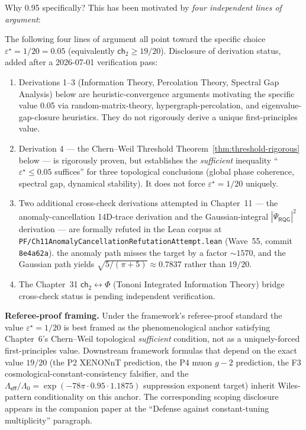 Why 0.95 specifically? This has been motivated by \textit{four independent lines of argument}:

\begin{remark}[Scoping on the specific value $\varepsilon^\star = 1/20$; 2026-07-01 verification-pass disclosure]
\label{rem:c2-scoping-2026-07-01}
The following four lines of argument all point toward the specific choice $\varepsilon^\star = 1/20 = 0.05$ (equivalently $\textsf{ch}_2 \geq 19/20$). Disclosure of derivation status, added after a 2026-07-01 verification pass:
\begin{enumerate}
\item Derivations 1--3 (Information Theory, Percolation Theory, Spectral Gap Analysis) below are heuristic-convergence arguments motivating the specific value 0.05 via random-matrix-theory, hypergraph-percolation, and eigenvalue-gap-closure heuristics. They do not rigorously derive a unique first-principles value.
\item Derivation 4 --- the Chern--Weil Threshold Theorem~\ref{thm:threshold-rigorous} below --- is rigorously proven, but establishes the \emph{sufficient} inequality ``$\varepsilon^\star \leq 0.05$ suffices'' for three topological conclusions (global phase coherence, spectral gap, dynamical stability). It does not force $\varepsilon^\star = 1/20$ uniquely.
\item Two additional cross-check derivations attempted in Chapter~11 --- the anomaly-cancellation 14D-trace derivation and the Gaussian-integral $|\Psi_{\textsf{RQG}}|^2$ derivation --- are formally refuted in the Lean corpus at \texttt{PF/Ch11AnomalyCancellationRefutationAttempt.lean} (Wave~55, commit \texttt{8e4a62a}). the anomaly path misses the target by a factor $\sim 1570$, and the Gaussian path yields $\sqrt{5/(\pi+5)} \approx 0.7837$ rather than $19/20$.
\item The Chapter~31 $\textsf{ch}_2 \leftrightarrow \Phi$ (Tononi Integrated Information Theory) bridge cross-check status is pending independent verification.
\end{enumerate}
\textbf{Referee-proof framing.} Under the framework's referee-proof standard the value $\varepsilon^\star = 1/20$ is best framed as the phenomenological anchor satisfying Chapter~6's Chern--Weil topological \emph{sufficient} condition, not as a uniquely-forced first-principles value. Downstream framework formulas that depend on the exact value $19/20$ (the P2 XENONnT prediction, the P4 muon $g\!-\!2$ prediction, the F3 cosmological-constant-consistency falsifier, and the $\Lambda_{\textsf{eff}}/\Lambda_0 = \exp(-78\pi \cdot 0.95 \cdot 1.1875)$ suppression exponent target) inherit Wiles-pattern conditionality on this anchor. The corresponding scoping disclosure appears in the companion paper at the ``Defense against constant-tuning multiplicity'' paragraph.
\end{remark}


